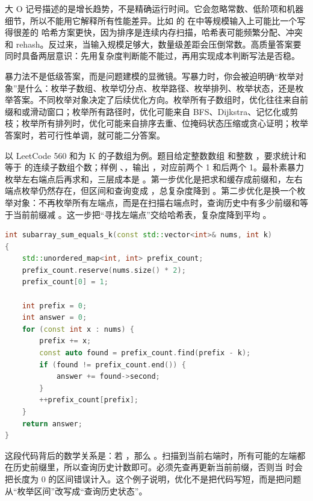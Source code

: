 \begin{deepdive}
大 O 记号描述的是增长趋势，不是精确运行时间。它会忽略常数、低阶项和机器细节，所以不能用它解释所有性能差异。比如  的  在中等规模输入上可能比一个写得很差的  哈希方案更快，因为排序是连续内存扫描，哈希表可能频繁分配、冲突和 rehash。反过来，当输入规模足够大，数量级差距会压倒常数。高质量答案要同时具备两层意识：先用复杂度判断能不能过，再用实现成本判断写法是否稳。
\end{deepdive}

暴力法不是低级答案，而是问题建模的显微镜。写暴力时，你会被迫明确“枚举对象”是什么：枚举子数组、枚举切分点、枚举路径、枚举排列、枚举状态，还是枚举答案。不同枚举对象决定了后续优化方向。枚举所有子数组时，优化往往来自前缀和或滑动窗口；枚举所有路径时，优化可能来自 BFS、Dijkstra、记忆化或剪枝；枚举所有排列时，优化可能来自排序去重、位掩码状态压缩或贪心证明；枚举答案时，若可行性单调，就可能二分答案。

以 LeetCode 560 和为 K 的子数组为例。题目给定整数数组  和整数 ，要求统计和等于  的连续子数组个数；样例 、，输出 ，对应前两个 1 和后两个 1。最朴素暴力枚举左右端点后再求和，三层成本是 。第一步优化是把求和缓存成前缀和，左右端点枚举仍然存在，但区间和查询变成 ，总复杂度降到 。第二步优化是换一个枚举对象：不再枚举所有左端点，而是在扫描右端点时，查询历史中有多少前缀和等于当前前缀减 。这一步把“寻找左端点”交给哈希表，复杂度降到平均 。

\begin{lstlisting}[language=C++,caption={LeetCode 560 和为 K 的子数组：从前缀和到哈希计数}]
int subarray_sum_equals_k(const std::vector<int>& nums, int k)
{
    std::unordered_map<int, int> prefix_count;
    prefix_count.reserve(nums.size() * 2);
    prefix_count[0] = 1;

    int prefix = 0;
    int answer = 0;
    for (const int x : nums) {
        prefix += x;
        const auto found = prefix_count.find(prefix - k);
        if (found != prefix_count.end()) {
            answer += found->second;
        }
        ++prefix_count[prefix];
    }
    return answer;
}
\end{lstlisting}

这段代码背后的数学关系是：若 ，那么 。扫描到当前右端时，所有可能的左端都在历史前缀里，所以查询历史计数即可。必须先查再更新当前前缀，否则当  时会把长度为 0 的区间错误计入。这个例子说明，优化不是把代码写短，而是把问题从“枚举区间”改写成“查询历史状态”。

